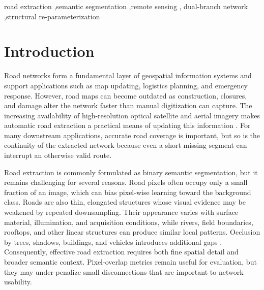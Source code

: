 \documentclass[a4paper,fleqn, review]{cas-sc}
\begin{document}
\begin{keywords}
road extraction \sep semantic segmentation \sep remote sensing \sep
dual-branch network \sep structural re-parameterization
\end{keywords}

\maketitle

\section{Introduction}
\label{sec:introduction}
Road networks form a fundamental layer of geospatial information systems and
support applications such as map updating, logistics planning, and emergency
response. However, road maps can become outdated as construction, closures, and
damage alter the network faster than manual digitization can capture. The
increasing availability of high-resolution optical satellite and aerial imagery
makes automatic road extraction a practical means of updating this information
\cite{abdollahi2020roadreview,chen2022roadsurvey,luweng2025roadreview}.
For many downstream applications, accurate road coverage is important, but so is
the continuity of the extracted network because even a short missing segment can
interrupt an otherwise valid route.

Road extraction is commonly formulated as binary semantic segmentation, but it
remains challenging for several reasons. Road pixels often occupy only a small
fraction of an image, which can bias pixel-wise learning toward the background
class. Roads are also thin, elongated structures whose visual evidence may be
weakened by repeated downsampling. Their appearance varies with surface material,
illumination, and acquisition conditions, while rivers, field boundaries,
rooftops, and other linear structures can produce similar local patterns.
Occlusion by trees, shadows, buildings, and vehicles introduces additional gaps
\cite{mnih2013aerial,cheng2017cascaded,zhou2020btroadnet}. Consequently,
effective road extraction requires both fine spatial detail and broader semantic
context. Pixel-overlap metrics remain useful for evaluation, but they may
under-penalize small disconnections that are important to network usability.
\end{document}

